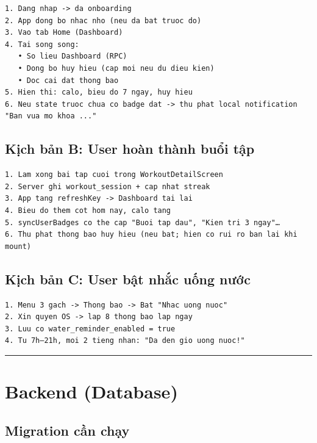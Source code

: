 \documentclass[12pt,a4paper]{article}
\begin{document}
\begin{verbatim}
1. Dang nhap -> da onboarding
2. App dong bo nhac nho (neu da bat truoc do)
3. Vao tab Home (Dashboard)
4. Tai song song:
   • So lieu Dashboard (RPC)
   • Dong bo huy hieu (cap moi neu du dieu kien)
   • Doc cai dat thong bao
5. Hien thi: calo, bieu do 7 ngay, huy hieu
6. Neu state truoc chua co badge dat -> thu phat local notification "Ban vua mo khoa ..."
\end{verbatim}

\subsection{Kịch bản B: User hoàn thành buổi
tập}\label{kux1ecbch-bux1ea3n-b-user-houxe0n-thuxe0nh-buux1ed5i-tux1eadp}

\begin{verbatim}
1. Lam xong bai tap cuoi trong WorkoutDetailScreen
2. Server ghi workout_session + cap nhat streak
3. App tang refreshKey -> Dashboard tai lai
4. Bieu do them cot hom nay, calo tang
5. syncUserBadges co the cap "Buoi tap dau", "Kien tri 3 ngay"…
6. Thu phat thong bao huy hieu (neu bat; hien co rui ro ban lai khi mount)
\end{verbatim}

\subsection{Kịch bản C: User bật nhắc uống
nước}\label{kux1ecbch-bux1ea3n-c-user-bux1eadt-nhux1eafc-uux1ed1ng-nux1b0ux1edbc}

\begin{verbatim}
1. Menu 3 gach -> Thong bao -> Bat "Nhac uong nuoc"
2. Xin quyen OS -> lap 8 thong bao lap ngay
3. Luu co water_reminder_enabled = true
4. Tu 7h–21h, moi 2 tieng nhan: "Da den gio uong nuoc!"
\end{verbatim}

\begin{center}\rule{0.5\linewidth}{0.5pt}\end{center}

\section{Backend (Database)}\label{backend-database}

\subsection{Migration cần chạy}\label{migration-cux1ea7n-chux1ea1y}
\end{document}
